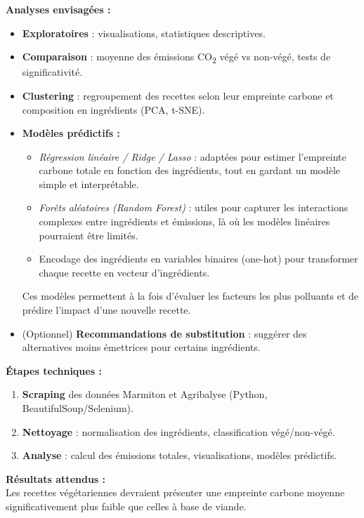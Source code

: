 \documentclass[11pt,a4paper]{article}
\begin{document}
\vspace{0.3cm}
\noindent\textbf{Analyses envisagées :}
\begin{itemize}[leftmargin=1.2cm, itemsep=0pt]
    \item \textbf{Exploratoires} : visualisations, statistiques descriptives.  
    \item \textbf{Comparaison} : moyenne des émissions CO\textsubscript{2} végé vs non-végé, tests de significativité.  
    \item \textbf{Clustering} : regroupement des recettes selon leur empreinte carbone et composition en ingrédients (PCA, t-SNE).  
    \item \textbf{Modèles prédictifs :}  
    \begin{itemize}[leftmargin=0.8cm, itemsep=0pt]
        \item \textit{Régression linéaire / Ridge / Lasso} : adaptées pour estimer l’empreinte carbone totale en fonction des ingrédients, tout en gardant un modèle simple et interprétable.  
        \item \textit{Forêts aléatoires (Random Forest)} : utiles pour capturer les interactions complexes entre ingrédients et émissions, là où les modèles linéaires pourraient être limités.  
        \item Encodage des ingrédients en variables binaires (one-hot) pour transformer chaque recette en vecteur d’ingrédients.  
    \end{itemize}
    Ces modèles permettent à la fois d’évaluer les facteurs les plus polluants et de prédire l’impact d’une nouvelle recette.  
    \item (Optionnel) \textbf{Recommandations de substitution} : suggérer des alternatives moins émettrices pour certains ingrédients.  
\end{itemize}

\vspace{0.3cm}
\noindent\textbf{Étapes techniques :}
\begin{enumerate}[leftmargin=1.2cm, itemsep=0pt]
    \item \textbf{Scraping} des données Marmiton et Agribalyse (Python, BeautifulSoup/Selenium).  
    \item \textbf{Nettoyage} : normalisation des ingrédients, classification végé/non-végé.  
    \item \textbf{Analyse} : calcul des émissions totales, visualisations, modèles prédictifs.  
\end{enumerate}

\vspace{0.3cm}
\noindent\textbf{Résultats attendus :}  \\
Les recettes végétariennes devraient présenter une empreinte carbone moyenne significativement plus faible que celles à base de viande.
\end{document}
